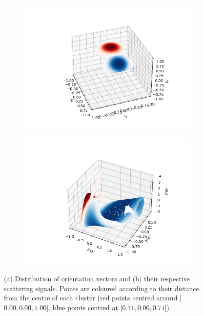 \documentclass[final,  3p]{elsarticle}
\begin{document}
\begin{figure}[h]
	\centering
	\begin{subfigure}{0.4\textwidth}
		\subcaption{}
		\includegraphics[width=\textwidth]{./Images/fig3a.png}
	\end{subfigure}
	\begin{subfigure}{0.4\textwidth}
		\subcaption{}
		\includegraphics[width=\textwidth]{./Images/fig3b.png}
	\end{subfigure}
	\caption{(a) Distribution of orientation vectors and (b) their respective scattering signals. Points are coloured according to their distance from the centre of each cluster (red points centred around [$0.00, 0.00, 1.00$], blue points centred at [$0.71, 0.00, 0.71$])}
	\label{fig:mixing}
\end{figure}
\end{document}

